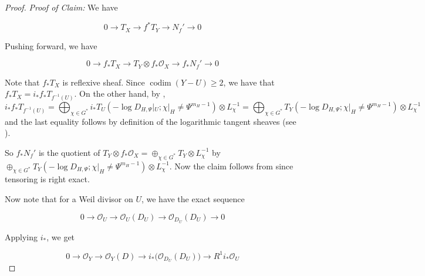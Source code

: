 \documentclass[12pt,twoside,]{amsart}
\theoremstyle{plain}
\theoremstyle{definition}
\begin{document}
\begin{proof}
\noindent\textit{Proof of Claim:} We have 

$$0 \to T_X \to f^*T_Y \to N_f'  \to  0$$

Pushing forward, we have 

$$0 \to f_*T_X \to T_Y \otimes f_*\mathcal{O}_X \to f_*N_f' \to 0 $$

Note that $f_*T_X$ is reflexive sheaf. Since $\operatorname{codim}(Y-U) \geq 2$, we have that $f_*T_X = i_*f_*T_{f^{-1}(U)}$. On the other hand, by \cite[Proposition $4.1$ page $207$]{pardini1991abelian}, 
$$i_*f_*T_{f^{-1}(U)} = \bigoplus_{\chi \in G^*} i_*T_U(-\operatorname{log} D_{H,\Psi}|_U; \chi|_H \neq \Psi^{m_H-1}) \otimes L_{\chi}^{-1} = \bigoplus_{\chi \in G^*} T_Y(-\operatorname{log} D_{H,\Psi}; \chi|_H \neq \Psi^{m_H-1}) \otimes L_{\chi}^{-1}$$
and the last equality follows by definition of the logarithmic tangent sheaves (see ).

So $f_*N_f'$ is the quotient of $T_Y \otimes f_*\mathcal{O}_X = \oplus_{\chi \in G^*} T_Y \otimes L_{\chi}^{-1}$ by $\oplus_{\chi \in G^*} T_Y(-\operatorname{log} D_{H,\Psi}; \chi|_H \neq \Psi^{m_H-1})\otimes L_{\chi}^{-1}$. Now the claim follows from  since tensoring is right exact.  

Now note that for a Weil divisor on $U$, we have the exact sequence

\begin{equation*}
    0 \to \mathcal{O}_U \to \mathcal{O}_U(D_U) \to \mathcal{O}_{D_U}(D_U) \to 0
\end{equation*}

Applying $i_*$, we get 

\begin{equation*}
    0 \to \mathcal{O}_Y \to \mathcal{O}_Y(D) \to i_*\big(\mathcal{O}_{D_U}(D_U)\big) \to R^1i_*\mathcal{O}_U
\end{equation*}


\end{proof}
\end{document}
